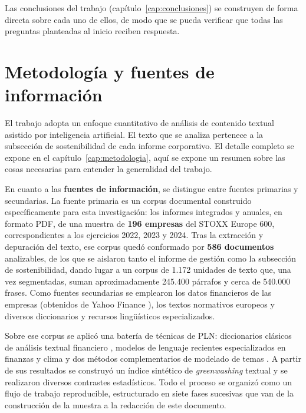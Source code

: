 Las conclusiones del trabajo (capítulo~\ref{cap:conclusiones}) se construyen de
forma directa sobre cada uno de ellos, de modo que se pueda verificar que todas las
preguntas planteadas al inicio reciben respuesta.

\section{Metodología y fuentes de información}
\label{sec:metodologia-resumen}

El trabajo adopta un enfoque cuantitativo de análisis de contenido textual asistido por
inteligencia artificial. El texto que se analiza pertenece a la subsección de sostenibilidad de cada
informe corporativo. El detalle completo se expone en el capítulo~\ref{cap:metodologia}, aquí se expone 
un resumen sobre las cosas necesarias para entender la generalidad del trabajo.

En cuanto a las \textbf{fuentes de información}, se distingue entre fuentes primarias y
secundarias. La fuente primaria es un corpus documental construido específicamente para esta
investigación: los informes integrados y anuales, en formato PDF, de una muestra de
\textbf{196 empresas} del STOXX Europe 600, correspondientes a los ejercicios 2022, 2023 y
2024. Tras la extracción y depuración del texto, ese corpus quedó conformado por
\textbf{586 documentos} analizables, de los que se aislaron tanto el informe de gestión como
la subsección de sostenibilidad, dando lugar a un corpus de 1.172 unidades de texto
que, una vez segmentadas, suman aproximadamente 245.400 párrafos y cerca de
540.000 frases. Como fuentes secundarias se emplearon los datos financieros de las
empresas (obtenidos de Yahoo Finance \parencite{yfinance2024}), los textos normativos
europeos \parencite{nfrd2014,csrd2022,esrs2023,taxonomia2020,sfdr2019} y diversos diccionarios
y recursos lingüísticos especializados.

Sobre ese corpus se aplicó una batería de técnicas de PLN: diccionarios
clásicos de análisis textual financiero \parencite{loughran2011}, modelos de lenguaje
recientes especializados en finanzas y clima \parencite{araci2019,webersinke2022} y 
dos métodos complementarios de modelado de temas \parencite{blei2003,grootendorst2022}.
A partir de sus resultados se construyó un índice sintético de \textit{greenwashing} textual
y se realizaron diversos contrastes estadísticos. Todo el proceso se organizó como un flujo
de trabajo reproducible, estructurado en siete fases sucesivas que van de la construcción de
la muestra a la redacción de este documento.

